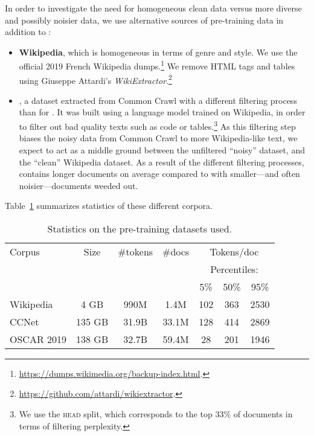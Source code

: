 In order to investigate the need for homogeneous clean data versus more diverse and possibly noisier data, we use alternative sources of pre-training data in addition to :
\begin{itemize}
    \item \textbf{Wikipedia}, which is homogeneous in terms of genre and style. We use the official 2019 French Wikipedia dumps.\footnote{ \url{https://dumps.wikimedia.org/backup-index.html}.} We remove HTML tags and tables using Giuseppe Attardi's  \emph{WikiExtractor}.\footnote{ \url{https://github.com/attardi/wikiextractor}.}
    \item \textbf{\ccnet} \citep{wenzek-etal-2020-ccnet}, a dataset extracted from Common Crawl with a different filtering process than for \oscar. It was built using a language model trained on Wikipedia, in order to filter out bad quality texts such as code or tables.\footnote{We use the \textsc{head} split, which corresponds to the top 33\% of documents in terms of filtering perplexity.} As this filtering step biases the noisy data from Common Crawl to more Wikipedia-like text, we expect \ccnet to act as a middle ground between the unfiltered ``noisy''  dataset, and the ``clean'' Wikipedia dataset. As a result of the different filtering processes, \ccnet contains longer documents on average compared to  with smaller---and often noisier---documents weeded out.
\end{itemize}
Table~\ref{table:corpora_statistics} summarizes statistics of these different corpora.

\begin{table}[ht]
    \centering\small
    \begin{tabular}{lcccccc}
        \toprule
        Corpus     & Size   & \#tokens & \#docs & \multicolumn{3}{c}{Tokens/doc}                 \\
                   &        &          &        & \multicolumn{3}{c}{Percentiles:}               \\
                   &        &          &        & 5\%                              & 50\% & 95\% \\
        \midrule
        Wikipedia  & 4 GB   & 990M     & 1.4M   & 102                              & 363  & 2530 \\
        CCNet      & 135 GB & 31.9B    & 33.1M  & 128                              & 414  & 2869 \\
        OSCAR 2019 & 138 GB & 32.7B    & 59.4M  & 28                               & 201  & 1946 \\
        \bottomrule
    \end{tabular}
    \caption{Statistics on the pre-training datasets used.}
    \label{table:corpora_statistics}
\end{table}

